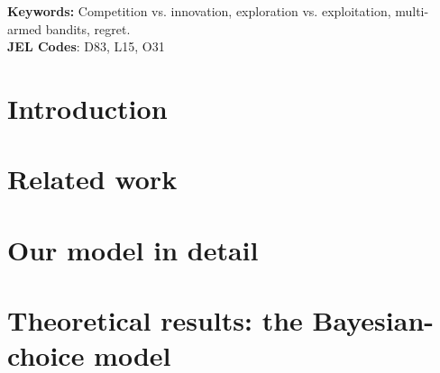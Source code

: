 \documentclass[12pt]{article}
\newcommand{\TheoryModel}{Bayesian-choice model\xspace}
\begin{document}
\vspace{-5mm}
\begin{abstract}

\end{abstract}

\noindent\textbf{Keywords:}  Competition vs. innovation, exploration vs. exploitation, multi-armed bandits, regret. \\
\noindent\textbf{JEL Codes}: D83, L15, O31


\thispagestyle{empty}

\newpage
{}
%
%
\section{Introduction}
\label{sec:intro}



\section{Related work}
\label{sec:related-work}


\section{Our model in detail}
\label{sec:model}


\section{Theoretical results: the \TheoryModel}
\label{sec:theory}

\end{document}
